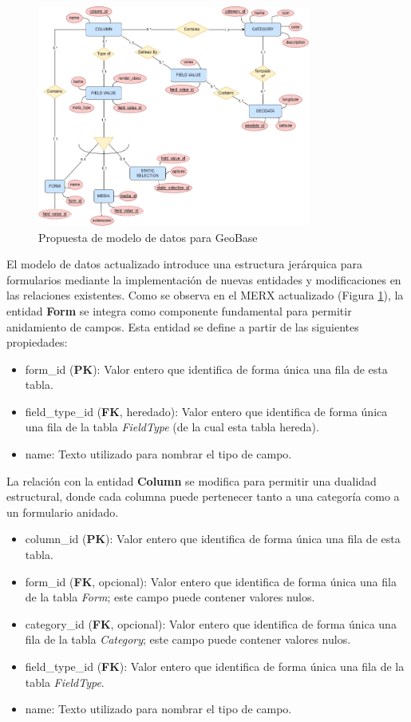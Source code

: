 \documentclass{article}
\begin{document}
\begin{figure}[H]
\centering
\includegraphics[width=0.8\textwidth]{images/new_merx.png}
\caption{Propuesta de modelo de datos para GeoBase}
\label{fig:newmerx}
\end{figure}

El modelo de datos actualizado introduce una estructura jerárquica para formularios mediante la implementación de nuevas entidades y modificaciones en las relaciones existentes. Como se observa en el MERX actualizado (Figura \ref{fig:newmerx}), la entidad \textbf{Form} se integra como componente fundamental para permitir anidamiento de campos. Esta entidad se define a partir de las siguientes propiedades:

\begin{itemize}
  \item form\_id (\textbf{PK}): Valor entero que identifica de forma única una fila de esta tabla.
  \item field\_type\_id (\textbf{FK}, heredado): Valor entero que identifica de forma única una fila de la tabla \textit{FieldType} (de la cual esta tabla hereda). 
  \item name: Texto utilizado para nombrar el tipo de campo.
\end{itemize}

La relación con la entidad \textbf{Column} se modifica para permitir una dualidad estructural, donde cada columna puede pertenecer tanto a una categoría como a un formulario anidado.

\begin{itemize}
  \item column\_id (\textbf{PK}): Valor entero que identifica de forma única una fila de esta tabla.
  \item form\_id (\textbf{FK}, opcional): Valor entero que identifica de forma única una fila de la tabla \textit{Form}; este campo puede contener valores nulos.
  \item category\_id (\textbf{FK}, opcional): Valor entero que identifica de forma única una fila de la tabla \textit{Category}; este campo puede contener valores nulos.
  \item  field\_type\_id (\textbf{FK}): Valor entero que identifica de forma única una fila de la tabla \textit{FieldType}.
  \item name: Texto utilizado para nombrar el tipo de campo.
\end{itemize}
\end{document}
